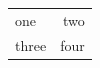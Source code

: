 \documentclass[11pt]{article}
\begin{document}
\begin{tabular}{|l|r|}
\hline
one & two \\
three & four \\
\hline
\end{tabular}
\end{document}
